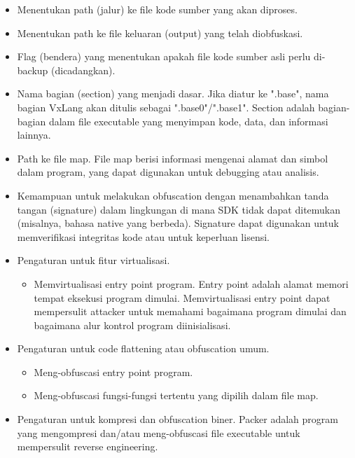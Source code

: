 \begin{itemize}
	\item {} Menentukan path (jalur) ke file kode sumber yang akan diproses.
	\item {} Menentukan path ke file keluaran (output) yang telah diobfuskasi.
	\item {} Flag (bendera) yang menentukan apakah file kode sumber asli perlu di-backup (dicadangkan).
	\item {} Nama bagian (section) yang menjadi dasar. Jika diatur ke ".base", nama bagian VxLang akan ditulis sebagai ".base0"/".base1". Section adalah bagian-bagian dalam file executable yang menyimpan kode, data, dan informasi lainnya.
	\item {} Path ke file map. File map berisi informasi mengenai alamat dan simbol dalam program, yang dapat digunakan untuk debugging atau analisis.
	\item {} Kemampuan untuk melakukan obfuscation dengan menambahkan tanda tangan (signature) dalam lingkungan di mana SDK tidak dapat ditemukan (misalnya, bahasa native yang berbeda). Signature dapat digunakan untuk memverifikasi integritas kode atau untuk keperluan lisensi.
	\item {} Pengaturan untuk fitur virtualisasi.
	      \begin{itemize}
		      \item {} Memvirtualisasi entry point program. Entry point adalah alamat memori tempat eksekusi program dimulai. Memvirtualisasi entry point dapat mempersulit attacker untuk memahami bagaimana program dimulai dan bagaimana alur kontrol program diinisialisasi.
	      \end{itemize}
	\item {} Pengaturan untuk code flattening atau obfuscation umum.
	      \begin{itemize}
		      \item {} Meng-obfuscasi entry point program.
		      \item {} Meng-obfuscasi fungsi-fungsi tertentu yang dipilih dalam file map.
	      \end{itemize}
	\item {} Pengaturan untuk kompresi dan obfuscation biner. Packer adalah program yang mengompresi dan/atau meng-obfuscasi file executable untuk mempersulit reverse engineering.
	      \begin{itemize}

\end{itemize}
\end{itemize}
